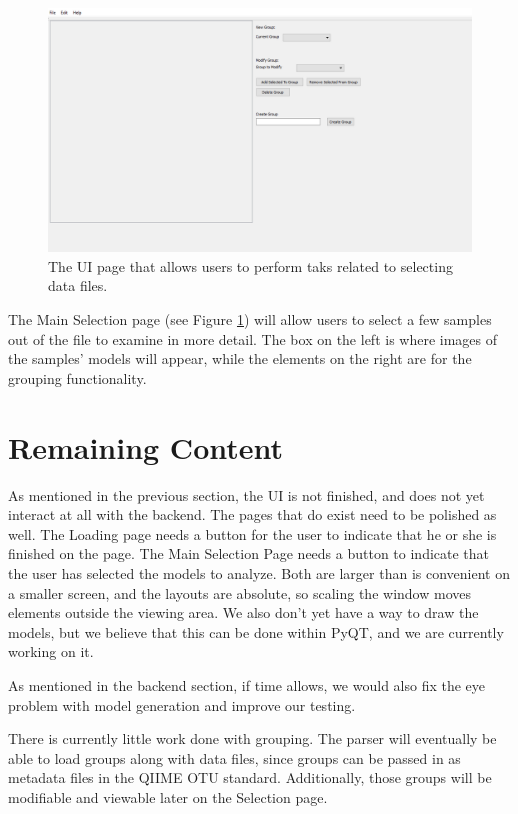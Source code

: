\documentclass[letterpaper,10pt, onecolumn]{IEEEtran}
\begin{document}
\begin{figure}
	\includegraphics[width=\textwidth]{MainInterface}
	\caption{The UI page that allows users to perform taks related to selecting data files.}
	\label{fig:MainInterface}
\end{figure}

The Main Selection page (see Figure \ref{fig:MainInterface}) will allow users to select a few samples out of the file to examine in more detail. The box on the left is where images of the samples' models will appear, while the elements on the right are for the grouping functionality.

\section*{Remaining Content}

As mentioned in the previous section, the UI is not finished, and does not yet interact at all with the backend. The pages that do exist need to be polished as well. The Loading page needs a button for the user to indicate that he or she is finished on the page. The Main Selection Page needs a button to indicate that the user has selected the models to analyze. Both are larger than is convenient on a smaller screen, and the layouts are absolute, so scaling the window moves elements outside the viewing area. We also don't yet have a way to draw the models, but we believe that this can be done within PyQT, and we are currently working on it.

As mentioned in the backend section, if time allows, we would also fix the eye problem with model generation and improve our testing.

There is currently little work done with grouping. The parser will eventually be able to load groups along with data files, since groups can be passed in as metadata files in the QIIME OTU standard. Additionally, those groups will be modifiable and viewable later on the Selection page.
\end{document}
